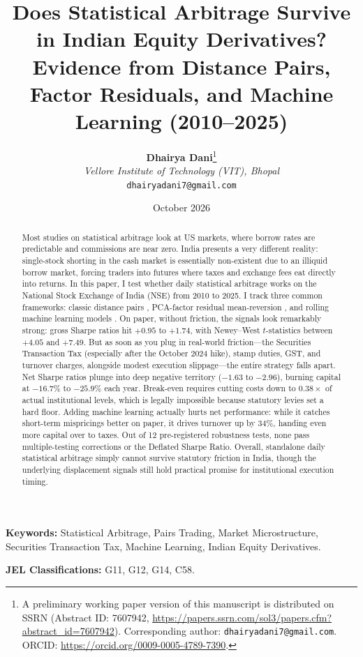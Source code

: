\documentclass[11pt,a4paper]{article}
\title{\textbf{Does Statistical Arbitrage Survive in Indian Equity Derivatives?}\\
\large Evidence from Distance Pairs, Factor Residuals, and Machine Learning (2010--2025)}
\author{
    \textbf{Dhairya Dani}\thanks{A preliminary working paper version of this manuscript is distributed on SSRN (Abstract ID: 7607942, \url{https://papers.ssrn.com/sol3/papers.cfm?abstract_id=7607942}). Corresponding author: \texttt{dhairyadani7@gmail.com}. ORCID: \url{https://orcid.org/0009-0005-4789-7390}.} \\
    \textit{Vellore Institute of Technology (VIT), Bhopal} \\
    \texttt{dhairyadani7@gmail.com}
}
\date{October 2026}
\begin{document}
\maketitle

\begin{abstract}
Most studies on statistical arbitrage look at US markets, where borrow rates are predictable and commissions are near zero. India presents a very different reality: single-stock shorting in the cash market is essentially non-existent due to an illiquid borrow market, forcing traders into futures where taxes and exchange fees eat directly into returns. In this paper, I test whether daily statistical arbitrage works on the National Stock Exchange of India (NSE) from 2010 to 2025. I track three common frameworks: classic distance pairs \citep{gatev2006pairs}, PCA-factor residual mean-reversion \citep{avellaneda2010statistical}, and rolling machine learning models \citep{guijarro2021deep}. On paper, without friction, the signals look remarkably strong: gross Sharpe ratios hit $+0.95$ to $+1.74$, with Newey--West $t$-statistics between $+4.05$ and $+7.49$. But as soon as you plug in real-world friction---the Securities Transaction Tax (especially after the October 2024 hike), stamp duties, GST, and turnover charges, alongside modest execution slippage---the entire strategy falls apart. Net Sharpe ratios plunge into deep negative territory ($-1.63$ to $-2.96$), burning capital at $-16.7\%$ to $-25.9\%$ each year. Break-even requires cutting costs down to $0.38\times$ of actual institutional levels, which is legally impossible because statutory levies set a hard floor. Adding machine learning actually hurts net performance: while it catches short-term mispricings better on paper, it drives turnover up by 34\%, handing even more capital over to taxes. Out of 12 pre-registered robustness tests, none pass multiple-testing corrections or the Deflated Sharpe Ratio. Overall, standalone daily statistical arbitrage simply cannot survive statutory friction in India, though the underlying displacement signals still hold practical promise for institutional execution timing.
\end{abstract}

\vspace{1em}
\noindent \textbf{Keywords:} Statistical Arbitrage, Pairs Trading, Market Microstructure, Securities Transaction Tax, Machine Learning, Indian Equity Derivatives.

\vspace{0.5em}
\noindent \textbf{JEL Classifications:} G11, G12, G14, C58.
\end{document}
